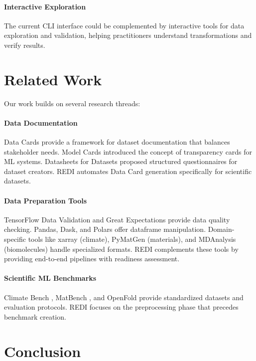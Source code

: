 \documentclass[11pt,letterpaper,twocolumn]{article}
\begin{document}
\paragraph{Interactive Exploration}
The current CLI interface could be complemented by interactive tools for data exploration and validation, helping practitioners understand transformations and verify results.

\section{Related Work}

Our work builds on several research threads:

\paragraph{Data Documentation}
Data Cards \citep{datacards2022} provide a framework for dataset documentation that balances stakeholder needs. Model Cards \citep{modelcards2019} introduced the concept of transparency cards for ML systems. Datasheets for Datasets \citep{datasheets2018} proposed structured questionnaires for dataset creators. REDI automates Data Card generation specifically for scientific datasets.

\paragraph{Data Preparation Tools}
TensorFlow Data Validation and Great Expectations provide data quality checking. Pandas, Dask, and Polars offer dataframe manipulation. Domain-specific tools like xarray (climate), PyMatGen (materials), and MDAnalysis (biomolecules) handle specialized formats. REDI complements these tools by providing end-to-end pipelines with readiness assessment.

\paragraph{Scientific ML Benchmarks}
Climate Bench \citep{climatebench2022}, MatBench \citep{matbench2020}, and OpenFold provide standardized datasets and evaluation protocols. REDI focuses on the preprocessing phase that precedes benchmark creation.

\section{Conclusion}
\end{document}
